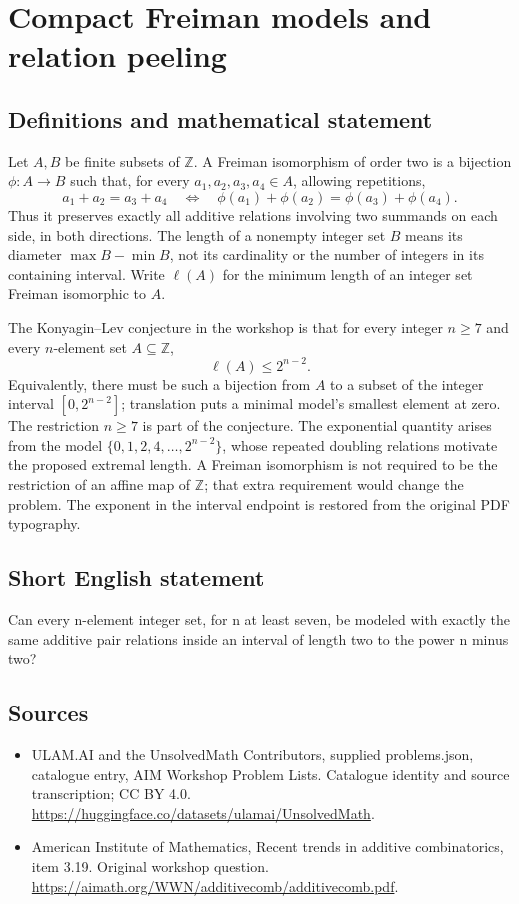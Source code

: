 \documentclass[11pt,a4paper]{article}
\begin{document}
\section*{Compact Freiman models and relation peeling}\label{statement}

\subsection{Definitions and mathematical statement}
Let $A,B$ be finite subsets of $\mathbb Z$. A Freiman isomorphism
of order two is a bijection $\phi:A\to B$ such that, for every
$a_1,a_2,a_3,a_4\in A$, allowing repetitions,
\[
 a_1+a_2=a_3+a_4
 \quad\Longleftrightarrow\quad
 \phi(a_1)+\phi(a_2)=\phi(a_3)+\phi(a_4).
\]
Thus it preserves exactly all additive relations involving two
summands on each side, in both directions. The length of a nonempty
integer set $B$ means its diameter $\max B-\min B$, not its
cardinality or the number of integers in its containing interval.
Write $\ell(A)$ for the minimum length of an integer set Freiman
isomorphic to $A$.

The Konyagin--Lev conjecture in the workshop is that for every
integer $n\ge7$ and every $n$-element set $A\subseteq\mathbb Z$,
\[
                                  \ell(A)\le2^{n-2}.
\]
Equivalently, there must be such a bijection from $A$ to a subset
of the integer interval $[0,2^{n-2}]$; translation puts a minimal
model's smallest element at zero. The restriction $n\ge7$ is part
of the conjecture.
The exponential quantity arises from the model
$\{0,1,2,4,\ldots,2^{n-2}\}$, whose repeated doubling relations
motivate the proposed extremal length. A Freiman isomorphism is not
required to be the restriction of an affine map of $\mathbb Z$;
that extra requirement would change the problem. The exponent in
the interval endpoint is restored from the original PDF typography.
\subsection{Short English statement}
Can every n-element integer set, for n at least seven, be modeled with exactly the same additive pair relations inside an interval of length two to the power n minus two?
\subsection{Sources}
\begin{itemize}
\item[S1] ULAM.AI and the UnsolvedMath Contributors, supplied problems.json, catalogue entry, AIM Workshop Problem Lists. Catalogue identity and source transcription; CC BY 4.0.
\url{https://huggingface.co/datasets/ulamai/UnsolvedMath}.
\item[S2] American Institute of Mathematics, Recent trends in additive combinatorics, item 3.19. Original workshop question.
\url{https://aimath.org/WWN/additivecomb/additivecomb.pdf}.
\end{itemize}
\end{document}
